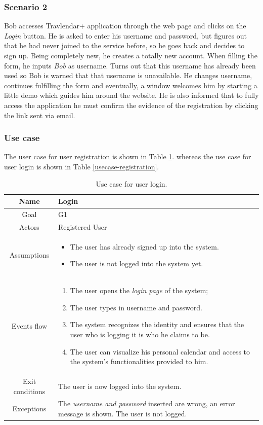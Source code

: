 \subsubsection{Scenario 2}
Bob accesses Travlendar+ application through the web page and clicks on the \textit{Login} button. He is asked to enter his username and password, but figures out that he had never joined to the service before, so he goes back and decides to sign up. Being completely new, he creates a totally new account. When filling the form, he inputs \textit{Bob} as username. Turns out that this username has already been used so Bob is warned that that username is unavailable. He changes username, continues fulfilling the form and eventually, a window welcomes him by starting a little demo which guides him around the website. He is also informed that to fully access the application he must confirm the evidence of the registration by clicking the link sent via email.

\subsubsection{Use case}
The user case for user registration is shown in Table \ref{usecase-login}. whereas the use case for user login is shown in Table \ref{usecase-registration}.
\begin{table}
\centering
\begin{tabular}{|c||p{}|}
	\hline
    Name & Login \\ \hline
    Goal & G1 \\ \hline
    Actors & Registered User \\ \hline
    Assumptions & \begin{itemize}
    					\item The user has already signed up into the system. 
                        \item The user is not logged into the system yet.
                  \end{itemize} \\ \hline
    Events flow & \begin{enumerate}
                   		\item The user opens the \textit{login page} of the system;
                        \item The user types in username and password.
                        \item The system recognizes the identity and ensures that the user who is logging it is who he claims to be.
                        \item The user can visualize his personal calendar and access to the system's functionalities provided to him.
                     \end{enumerate} \\ \hline
   Exit conditions & The user is now logged into the system. \\ \hline
   Exceptions & The \textit{username and password} inserted are wrong, an error message is shown. The user is not logged.\\ \hline
\end{tabular}
\caption{Use case for user login.}
\label{usecase-login}
\end{table}

